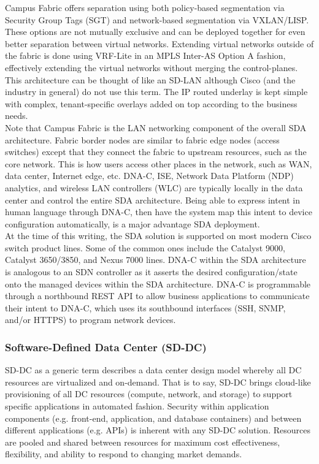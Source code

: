 Campus Fabric offers separation using both policy-based segmentation via
Security Group Tags (SGT) and network-based segmentation via VXLAN/LISP\@. These
options are not mutually exclusive and can be deployed together for even
better separation between virtual networks. Extending virtual networks outside
of the fabric is done using VRF-Lite in an MPLS Inter-AS Option A fashion,
effectively extending the virtual networks without merging the control-planes.
This architecture can be thought of like an SD-LAN although Cisco (and the
industry in general) do not use this term. The IP routed underlay is kept
simple with complex, tenant-specific overlays added on top according to the
business needs. \\

Note that Campus Fabric is the LAN networking component of the overall SDA
architecture. Fabric border nodes are similar to fabric edge nodes (access
switches) except that they connect the fabric to upstream resources, such as
the core network. This is how users access other places in the network, such
as WAN, data center, Internet edge, etc. DNA-C, ISE, Network Data Platform
(NDP) analytics, and wireless LAN controllers (WLC) are typically locally in
the data center and control the entire SDA architecture. Being able to express
intent in human language through DNA-C, then have the system map this intent
to device configuration automatically, is a major advantage SDA deployment. \\

At the time of this writing, the SDA solution is supported on most modern
Cisco switch product lines. Some of the common ones include the Catalyst 9000,
Catalyst 3650/3850, and Nexus 7000 lines. DNA-C within the SDA architecture is
analogous to an SDN controller as it asserts the desired configuration/state
onto the managed devices within the SDA architecture. DNA-C is programmable
through a northbound REST API to allow business applications to communicate
their intent to DNA-C, which uses its southbound interfaces (SSH, SNMP, and/or
HTTPS) to program network devices.

\subsubsection{Software-Defined Data Center (SD-DC)}
SD-DC as a generic term describes a data center design model whereby all DC
resources are virtualized and on-demand. That is to say, SD-DC brings
cloud-like provisioning of all DC resources (compute, network, and storage) to
support specific applications in automated fashion. Security within
application components (e.g. front-end, application, and database containers)
and between different applications (e.g. APIs) is inherent with any SD-DC
solution. Resources are pooled and shared between resources for maximum cost
effectiveness, flexibility, and ability to respond to changing market demands. \\

